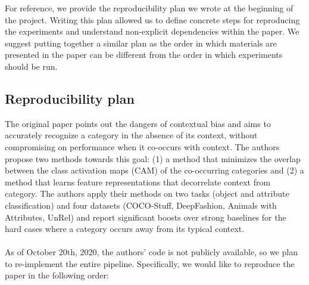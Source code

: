 For reference, we provide the reproducibility plan we wrote at the beginning of the project. Writing this plan allowed us to define concrete steps for reproducing the experiments and understand non-explicit dependencies within the paper. We suggest putting together a similar plan as the order in which materials are presented in the paper can be different from the order in which experiments should be run.

\subsection*{Reproducibility plan}

The original paper points out the dangers of contextual bias and aims to accurately recognize a category in the absence of its context, without compromising on performance when it co-occurs with context. The authors propose two methods towards this goal: (1) a method that minimizes the overlap between the class activation maps (CAM) of the co-occurring categories and (2) a method that learns feature representations that decorrelate context from category. The authors apply their methods on two tasks (object and attribute classification) and four datasets (COCO-Stuff, DeepFashion, Animals with Attributes, UnRel) and report significant boosts over strong baselines for the hard cases where a category occurs away from its typical context.\\
\\
As of October 20th, 2020, the authors’ code is not publicly available, so we plan to re-implement the entire pipeline. Specifically, we would like to reproduce the paper in the following order:

